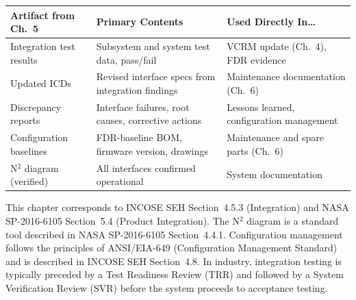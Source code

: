 \documentclass[11pt,letterpaper,twoside,openany]{book}
\begin{document}
\begin{center}
\small
\begin{tabularx}{\textwidth}{l X X}
\toprule
\textbf{Artifact from Ch.~5} & \textbf{Primary Contents} & \textbf{Used Directly In\ldots} \\
\midrule
Integration test results & Subsystem and system test data, pass/fail & VCRM update (Ch.~4), FDR evidence \\
Updated ICDs & Revised interface specs from integration findings & Maintenance documentation (Ch.~6) \\
Discrepancy reports & Interface failures, root causes, corrective actions & Lessons learned, configuration management \\
Configuration baselines & FDR-baseline BOM, firmware version, drawings & Maintenance and spare parts (Ch.~6) \\
N$^2$ diagram (verified) & All interfaces confirmed operational & System documentation \\
\bottomrule
\end{tabularx}
\end{center}

\begin{tipbox}
This chapter corresponds to INCOSE SEH Section~4.5.3 (Integration) and NASA SP-2016-6105 Section~5.4 (Product Integration). The N$^2$ diagram is a standard tool described in NASA SP-2016-6105 Section~4.4.1. Configuration management follows the principles of ANSI/EIA-649 (Configuration Management Standard) and is described in INCOSE SEH Section~4.8. In industry, integration testing is typically preceded by a Test Readiness Review (TRR) and followed by a System Verification Review (SVR) before the system proceeds to acceptance testing.
\end{tipbox}

\FloatBarrier
\end{document}
